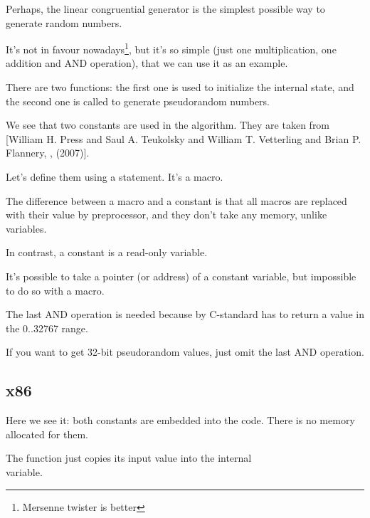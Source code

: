 \label{LCG_simple}

Perhaps, the linear congruential generator is the simplest possible way to generate random numbers.

It's not in favour nowadays\footnote{Mersenne twister is better}, but it's so simple 
(just one multiplication, one addition and AND operation), 
that we can use it as an example.



There are two functions: the first one is used to initialize the internal state, and the second one is called
to generate pseudorandom numbers.

We see that two constants are used in the algorithm.
They are taken from
[William H. Press and Saul A. Teukolsky and William T. Vetterling and Brian P. Flannery, , (2007)].

Let's define them using a  \CCpp statement. It's a macro.

The difference between a \CCpp macro and a constant is that all macros are replaced 
with their value by \CCpp preprocessor,
and they don't take any memory, unlike variables.

In contrast, a constant is a read-only variable.

It's possible to take a pointer (or address) of a constant variable, but impossible to do so with a macro.

The last AND operation is needed because by C-standard  has to return a value in 
the 0..32767 range.

If you want to get 32-bit pseudorandom values, just omit the last AND operation.

\subsection{x86}



Here we see it: both constants are embedded into the code.
There is no memory allocated for them.

The  function just copies its input value into the internal\\
 variable.

